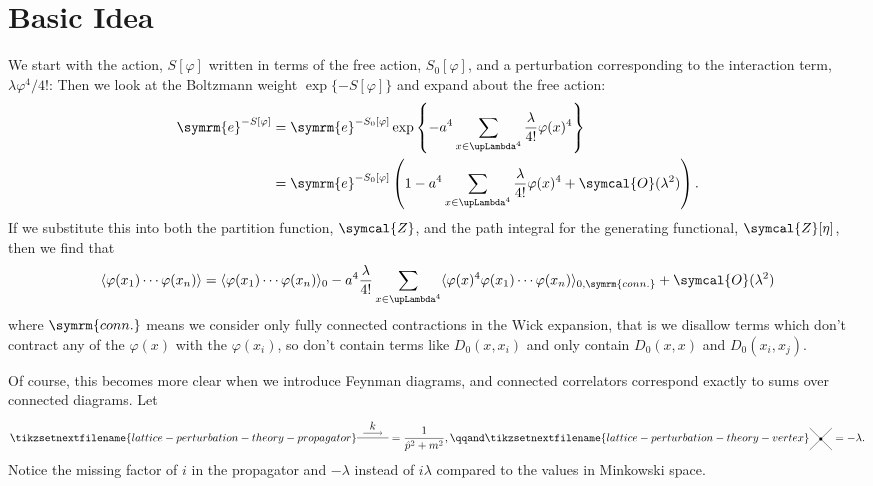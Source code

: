 \documentclass[fleqn]{NotesClass}
\newcommand{\e}{\symrm{e}}
\DeclarePairedDelimiter{\correlator}{\langle}{\rangle}
\newcommand{\order}{\symcal{O}}
\newcommand{\partitionFunction}{\symcal{Z}}
\newcommand{\lattice}[1][4]{\upLambda^{#1}}
\begin{document}
    \section{Basic Idea}
    We start with the action, \(S[\varphi]\) written in terms of the free action, \(S_0[\varphi]\), and a perturbation corresponding to the interaction term, \(\lambda\varphi^4/4!\):
    Then we look at the Boltzmann weight \(\exp\{-S[\varphi]\}\) and expand about the free action:
    \begin{align}
        \e^{-S[\varphi]} &= \e^{-S_0[\varphi]}\exp\left\{ -a^4\sum_{x\in\lattice} \frac{\lambda}{4!}\varphi(x)^4 \right\}\\
        &= \e^{-S_0[\varphi]} \left( 1 - a^4 \sum_{x\in\lattice} \frac{\lambda}{4!} \varphi(x)^4 + \order(\lambda^2) \right).
    \end{align}
    If we substitute this into both the partition function, \(\partitionFunction\), and the path integral for the generating functional, \(\partitionFunction[\eta]\), then we find that
    \begin{equation}
        \correlator{\varphi(x_1) \dotsm \varphi(x_n)} = \correlator{\varphi(x_1) \dotsm \varphi(x_n)}_{0} - a^4\frac{\lambda}{4!} \sum_{x\in\lattice} \correlator{\varphi(x)^4\varphi(x_1) \dotsm \varphi(x_n)}_{0, \symrm{conn.}} + \order(\lambda^2)
    \end{equation}
    where \(\symrm{conn.}\) means we consider only fully connected contractions in the Wick expansion, that is we disallow terms which don't contract any of the \(\varphi(x)\) with the \(\varphi(x_i)\), so don't contain terms like \(D_0(x, x_i)\) and only contain \(D_0(x, x)\) and \(D_0(x_i, x_j)\).
    
    Of course, this becomes more clear when we introduce Feynman diagrams, and connected correlators correspond exactly to sums over connected diagrams.
    Let
    \begin{equation}
        \tikzsetnextfilename{lattice-perturbation-theory-propagator}
        \begin{tikzpicture}[baseline=-3pt]
            \draw (0, 0) -- (1, 0);
            \draw[->] (0.2, 0.15) -- (0.8, 0.15) node [midway, above] {\(k\)};
        \end{tikzpicture}
         = \frac{1}{\hat{p}^2 + m^2}, \qqand 
         \tikzsetnextfilename{lattice-perturbation-theory-vertex}
         \begin{tikzpicture}[baseline=-2pt]
             \draw (45:0.5) -- (225:0.5);
             \draw (-45:0.5) -- (-225:0.5);
             \fill (0, 0) circle [radius = 0.05];
         \end{tikzpicture}
         = -\lambda.
    \end{equation}
    Notice the missing factor of \(i\) in the propagator and \(-\lambda\) instead of \(i\lambda\) compared to the values in Minkowski space.
    
\end{document}
